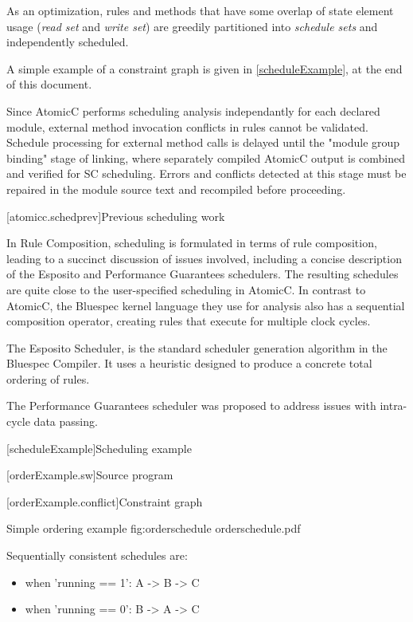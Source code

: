 As an optimization, rules and methods that have some overlap of state element usage
(\textit{read set} and \textit{write set})
are greedily partitioned into \textit{schedule sets}
and independently scheduled.

A simple example of a constraint graph is given in \ref{scheduleExample}, at the end of this document.

Since AtomicC performs scheduling analysis independantly for each
declared module, external method invocation conflicts in rules cannot be validated.
Schedule processing for external method calls is delayed until the "module group binding"
stage of linking, where separately compiled AtomicC output is combined and
verified
for SC scheduling.  Errors and conflicts detected at this stage must be repaired
in the module source text and recompiled before proceeding.

[atomicc.schedprev]{Previous scheduling work}

In Rule Composition\cite{Dave2007}, scheduling
is formulated in terms of rule composition, leading to a succinct discussion
of issues involved, including a concise description of the Esposito and
Performance Guarantees schedulers.  The resulting schedules are quite close
to the user-specified scheduling in AtomicC.
In contrast to AtomicC, the Bluespec kernel language they use
for analysis also has a sequential composition operator, creating rules
that execute for multiple clock cycles.

The Esposito Scheduler\cite{Esposito:Patent,Dave2007},
is the standard scheduler generation algorithm in the Bluespec Compiler.
It uses a heuristic designed to produce a concrete total ordering of rules.

The Performance Guarantees scheduler\cite{Rosenband:PerformanceGuarantees}
was proposed to address issues with intra-cycle data passing.


[scheduleExample]{Scheduling example}{}

[orderExample.sw]{Source program}



[orderExample.conflict]{Constraint graph}

\begin{importgraphic}
{Simple ordering example}
{fig:orderschedule}
{orderschedule.pdf}
\end{importgraphic}

Sequentially consistent schedules are:
\begin{itemize}[noitemsep,topsep=0pt]
\item when 'running == 1': A -> B -> C
\item when 'running == 0': B -> A -> C
\end{itemize}

